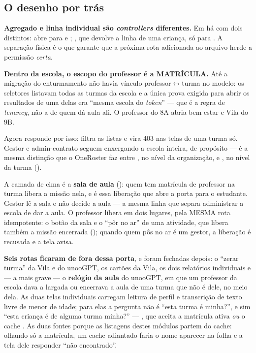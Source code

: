 \subsection{O desenho por trás}

\begin{decisao}
\textbf{Agregado e linha individual são \emph{controllers} diferentes.} Em
 há  com dois 
distintos:  abre para  e ;
, que devolve a linha de uma criança, só para
. A separação física é o que garante que a próxima rota adicionada
ao arquivo herde a permissão \emph{certa}.
\end{decisao}

\begin{decisao}
\textbf{Dentro da escola, o escopo do professor é a MATRÍCULA.} Até a migração
do enturmamento não havia vínculo professor$\leftrightarrow$turma no modelo: os
seletores listavam todas as turmas da escola e a única prova exigida para abrir
os resultados de uma delas era \enquote{mesma escola do \emph{token}} --- que é a
regra de \emph{tenancy}, não a de quem dá aula ali. O professor do 8A abria
bem-estar e Vila do 9B.

Agora  responde por isso:  filtra as
listas e  vira 403 nas telas de uma turma só. Gestor e
admin-contrato seguem enxergando a escola inteira, de propósito --- é a mesma
distinção que o OneRoster faz entre , no nível da organização, e
, no nível da turma ().

A camada de cima é a \textbf{sala de aula} (): quem tem matrícula
de professor na turma libera a missão nela, e é essa liberação que abre a porta
para o estudante. Gestor lê a sala e não decide a aula --- a mesma linha que
separa administrar a escola de dar a aula. O professor libera em dois lugares, pela
MESMA rota idempotente: o botão da sala e o \enquote{pôr no ar} de uma
atividade, que libera também a missão encerrada (); quando quem
pôs no ar é um gestor, a liberação é recusada e a tela avisa.

\textbf{Seis rotas ficaram de fora dessa porta}, e foram fechadas depois: o
\enquote{zerar turma} da Vila e do unooGPT, os cartões da Vila, os dois
relatórios individuais e --- a mais grave --- o \textbf{relógio da aula} do
unooGPT, em que um professor da escola dava a largada ou encerrava a aula de uma
turma que não é dele, no meio dela. As duas telas individuais carregam leitura de
perfil e transcrição de texto livre de menor de idade; para elas a pergunta não é
\enquote{esta turma é minha?}, e sim \enquote{esta criança é de alguma turma
minha?} --- , que aceita a matrícula ativa
\emph{ou} o cache . As duas fontes porque as listagens destes
módulos partem do cache: olhando só a matrícula, um cache adiantado faria o nome
aparecer na folha e a tela dele responder \enquote{não encontrado}.
\end{decisao}

